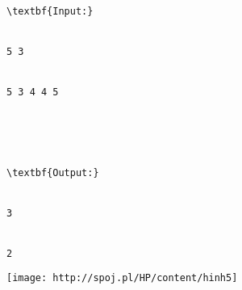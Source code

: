 \begin{verbatim}
\textbf{Input:}


5 3


5 3 4 4 5





\textbf{Output:}


3


2\end{verbatim}


\texttt{[image: http://spoj.pl/HP/content/hinh5]}